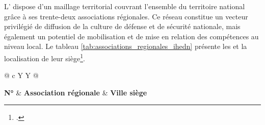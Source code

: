 L'\UnionIHEDN{} dispose d'un maillage territorial couvrant l'ensemble du territoire national grâce à ses trente-deux associations régionales. Ce réseau constitue un vecteur privilégié de diffusion de la culture de défense et de sécurité nationale, mais également un potentiel de mobilisation et de mise en relation des compétences au niveau local. Le tableau \ref{tab:associations_regionales_ihedn} présente les \AssociationsRegionalesIHEDN{} et la localisation de leur siège\footcite{ihedn_associations}.

\begin{table}[H]
\centering
\StyledTableSetup

\begin{tabularx}{\linewidth}{@{}
c
Y
Y
@{}}

\toprule
\textbf{N°} &
\textbf{Association régionale} &
\textbf{Ville siège} \\
\midrule


\end{tabularx}
\end{table}
